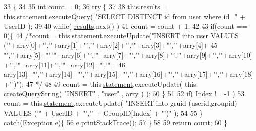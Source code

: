 \begin{DoxyCode}
33                                                                                              \{
34         
35         \textcolor{keywordtype}{int} count = 0;
36         \textcolor{keywordflow}{try} \{
37             
38             this.\hyperlink{classorg_1_1facebook_1_1crawler_1_1_facebook_database_af817784677223d8e6830d7040eb33784}{results} = this.\hyperlink{classorg_1_1facebook_1_1crawler_1_1_facebook_database_abba52e41f81d0010005388541288096d}{statement}.executeQuery( \textcolor{stringliteral}{"SELECT DISTINCT id from user where
       id="} + UserID );
39             
40             \textcolor{keywordflow}{while}( \hyperlink{classorg_1_1facebook_1_1crawler_1_1_facebook_database_af817784677223d8e6830d7040eb33784}{results}.next() )
41                 count = count + 1;
42             
43             \textcolor{keywordflow}{if}(count == 0)\{
44                 \textcolor{comment}{/*count = this.statement.executeUpdate("INSERT into user VALUES
       ('"+arry[0]+"','"+arry[1]+"','"+arry[2]+"','"+arry[3]+"','"+arry[4]+}
45 \textcolor{comment}{                        
      "','"+arry[5]+"','"+arry[6]+"','"+arry[7]+"','"+arry[8]+"','"+arry[9]+"','"+arry[10]+"','"+arry[11]+"','"+arry[12]+"','"+}
46 \textcolor{comment}{                        
      arry[13]+"','"+arry[14]+"','"+arry[15]+"','"+arry[16]+"','"+arry[17]+"','"+arry[18]+"')");}
47 \textcolor{comment}{                */}
48                 
49                 count = this.\hyperlink{classorg_1_1facebook_1_1crawler_1_1_facebook_database_abba52e41f81d0010005388541288096d}{statement}.executeUpdate( this.
      \hyperlink{classorg_1_1facebook_1_1crawler_1_1_facebook_database_ae79fc854e8901cdcede8cceba7e30704}{createQueryString}( \textcolor{stringliteral}{"INSERT"} , \textcolor{stringliteral}{"user"} , arry ) );
50             \}
51             
52             \textcolor{keywordflow}{if}( Index != -1 )
53             count = this.\hyperlink{classorg_1_1facebook_1_1crawler_1_1_facebook_database_abba52e41f81d0010005388541288096d}{statement}.executeUpdate( \textcolor{stringliteral}{"INSERT into gruid (userid,groupid) VALUES ('"} +
       UserID + \textcolor{stringliteral}{"','"} + GroupID[Index] + \textcolor{stringliteral}{"')"} );
54 
55         \} \textcolor{keywordflow}{catch}(Exception e)\{
56             e.printStackTrace();    
57         \}
58         
59         \textcolor{keywordflow}{return} count;
60     \}
\end{DoxyCode}

